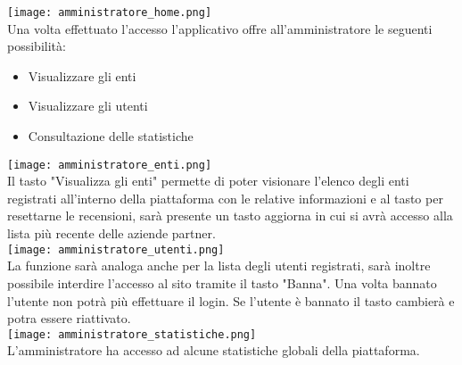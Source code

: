 \texttt{[image: amministratore\_home.png]}\\
Una volta effettuato l'accesso l'applicativo offre all'amministratore le seguenti possibilità:
\begin{itemize}
    \item Visualizzare gli enti
    \item Visualizzare gli utenti
    \item Consultazione delle statistiche
\end{itemize}
\texttt{[image: amministratore\_enti.png]}\\
Il tasto "Visualizza gli enti" permette di poter visionare l'elenco degli enti registrati all'interno della piattaforma con le relative informazioni e al tasto per resettarne le recensioni, sarà presente un tasto aggiorna in cui si avrà accesso alla lista più recente delle aziende partner.\\
\texttt{[image: amministratore\_utenti.png]}\\
La funzione sarà analoga anche per la lista degli utenti registrati, sarà inoltre possibile interdire l'accesso al sito tramite il tasto "Banna". Una volta bannato l'utente non potrà più effettuare il login. Se l'utente è bannato il tasto cambierà e potra essere riattivato.\\
\texttt{[image: amministratore\_statistiche.png]}\\
L'amministratore ha accesso ad alcune statistiche globali della piattaforma.